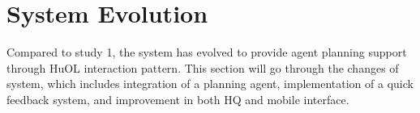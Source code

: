 


\section{System Evolution}\label{sec:studytwosystem}
Compared to study 1, the system has evolved to provide agent planning support through HuOL interaction pattern. This section will go through the changes of system, which includes integration of a planning agent, implementation of a quick feedback system, and improvement in both HQ and mobile interface.

